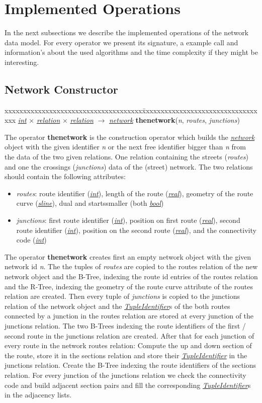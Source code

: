 \documentclass[a4paper]{article}
\newcommand{\op}[1]{\textbf{#1}}
\newcommand{\var}[1]{\textsl{#1}}
\newcommand{\dt}[1]{\textsl{\underline{#1}}}
\begin{document}
\section{Implemented Operations}
\label{sec:netoperations}
In the next subsections we describe the implemented operations of the network data model. For every operator we present its signature, a example call and information's about the used algorithms and the time complexity if they might be interesting.
\subsection{Network Constructor}
\begin{tabbing}
xxxxxxxxxxxxxxxxxxxxxxxxxxxxxxxxxxxxx\=xxxxxxxxxxxxxxxxxxxxxxxxxxxxxxxxxx\kill
\dt{int} $\times$ \dt{relation} $\times$ \dt{relation} $\rightarrow$ \dt{network} \>
\op{thenetwork}(\var{n}, \var{routes}, \var{junctions})\\
\end{tabbing}
The operator \op{thenetwork} is the construction operator which builds the \dt{network} object with the given identifier \var{n} or the next free identifier bigger than \var{n} from the data of the two given relations. One relation containing the streets (\var{routes}) and one the crossings (\var{junctions}) data of the (street) network. The two relations should contain the following attributes: 
\begin{itemize}
   \item \var{routes}: route identifier (\dt{int}), length of the route (\dt{real}), geometry of the route curve (\dt{sline}), dual and startssmaller (both \dt{bool})
   \item \var{junctions}: first route identifier (\dt{int}), position on first route (\dt{real}), second route identifier (\dt{int}), position on the second route (\dt{real}), and the connectivity code (\dt{int})
\end{itemize}
The operator \op{thenetwork} creates first an empty network object with the given network id \var{n}. The the tuples of \var{routes} are copied to the routes relation of the new network object and the B-Tree, indexing the route id entries of the routes relation and the R-Tree, indexing the geometry of the route curve attribute of the routes relation are created. Then every tuple of \var{junctions} is copied to the junctions relation of the network object and the \dt{TupleIdentifier}s of the both routes connected by a junction in the routes relation are stored at every junction of the junctions relation. The two B-Trees indexing the route identifiers of the first / second route in the junctions relation are created. After that for each junction of every route in the network routes relation: Compute the up and down section of the route, store it in the sections relation and store their \dt{TupleIdentifier} in the junctions relation. Create the B-Tree indexing the route identifiers of the sections relation. For every junction of the junctions relation we check the connectivity code and build adjacent section pairs and fill the corresponding \dt{TupleIdentifier}s in the adjacency lists.
\end{document}
